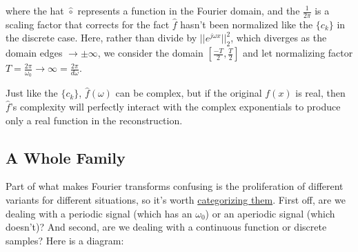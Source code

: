 \documentclass[10pt]{article}
\begin{document}
\noindent where the hat $\hat{\circ}$ represents a function in the Fourier domain, and the $\frac{1}{2\pi}$ is a scaling factor that corrects for the fact $\hat{f}$ hasn't been normalized like the $\{c_k\}$ in the discrete case. Here, rather than divide by $||e^{j \omega x}||_2^2$, which diverges as the domain edges $\to \pm \infty$, we consider the domain $[\frac{-T}{2}, \frac{T}{2}]$ and let normalizing factor $T = \frac{2\pi}{\omega_0} \to \infty = \frac{2\pi}{d\omega}$\cite{oppenheim}.

Just like the $\{c_k\}$, $\hat{f}(\omega)$ can be complex, but if the original $f(x)$ is real, then $\hat{f}$'s complexity will perfectly interact with the complex exponentials to produce only a real function in the reconstruction.

\subsection{A Whole Family}\label{family}

Part of what makes Fourier transforms confusing is the proliferation of different variants for different situations, so it's worth \href{https://medium.com/sho-jp/fourier-transform-101-part-4-discrete-fourier-transform-8fc3fbb763f3 }{categorizing them}\cite{medium}. First off, are we dealing with a periodic signal (which has an $\omega_0$) or an aperiodic signal (which doesn't)? And second, are we dealing with a continuous function or discrete samples? Here is a diagram:

\begin{center}
\end{center}
\end{document}
